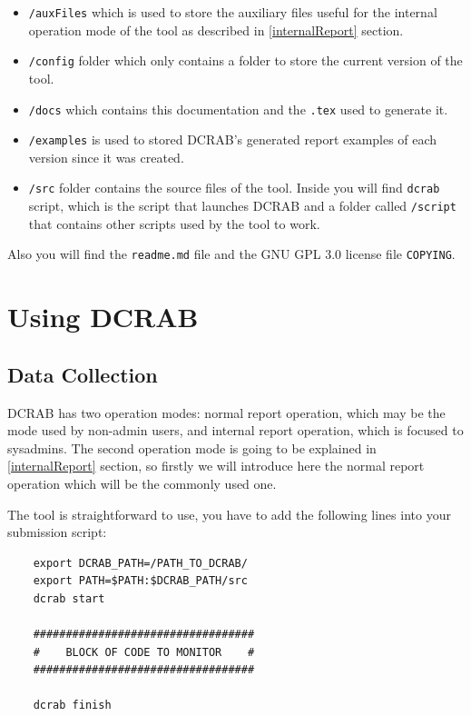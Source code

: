 \documentclass[10pt,a4paper]{report}
\begin{document}
\begin{itemize}
  \item \verb+/auxFiles+ which is used to store the auxiliary files useful for the internal operation mode of the tool as described in \ref{internalReport} section.
  \item \verb+/config+ folder which only contains a folder to store the current version of the tool.
  \item \verb+/docs+ which contains this documentation and the \verb+.tex+ used to generate it.
  \item \verb+/examples+ is used to stored DCRAB's generated report examples of each version since it was created.
  \item \verb+/src+ folder contains the source files of the tool. Inside you will find \verb+dcrab+ script, which is the script that launches DCRAB and a folder called \verb+/script+ that contains other scripts used by the tool to work.
\end{itemize}

Also you will find the \verb+readme.md+ file and the GNU GPL 3.0 license file \verb+COPYING+.

\chapter{Using DCRAB}

\section{Data Collection}
\label{dataCollection}
DCRAB has two operation modes: normal report operation, which may be the mode used by non-admin users, and internal report operation, which is focused to sysadmins. The second operation mode is going to be explained in \ref{internalReport} section, so firstly we will introduce here the normal report operation which will be the commonly used one.

The tool is straightforward to use, you have to add the following lines into your submission script:

\begin{verbatim}
    export DCRAB_PATH=/PATH_TO_DCRAB/
    export PATH=$PATH:$DCRAB_PATH/src
    dcrab start

    ##################################
    #    BLOCK OF CODE TO MONITOR    #
    ##################################

    dcrab finish
\end{verbatim}
\end{document}
